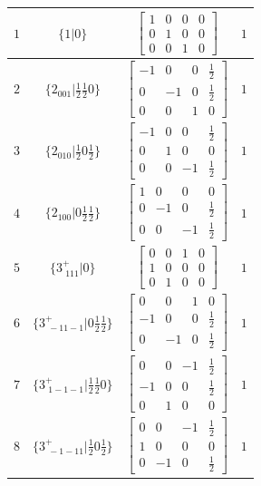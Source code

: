 \documentclass[fleqn,8pt]{jsarticle}
\begin{document}
\begin{longtable}{cccc}
$ 1 $ & $ \{1|0\} $ & $ \begin{bmatrix} 1 & 0 & 0 & 0 \\ 0 & 1 & 0 & 0 \\ 0 & 0 & 1 & 0 \end{bmatrix} $ & $ 1 $ \\ \hline
$ 2 $ & $ \{2{}_{001}|\frac{1}{2} \frac{1}{2} 0\} $ & $ \begin{bmatrix} -1 & 0 & 0 & \frac{1}{2} \\ 0 & -1 & 0 & \frac{1}{2} \\ 0 & 0 & 1 & 0 \end{bmatrix} $ & $ 1 $ \\ \hline
$ 3 $ & $ \{2{}_{010}|\frac{1}{2} 0 \frac{1}{2}\} $ & $ \begin{bmatrix} -1 & 0 & 0 & \frac{1}{2} \\ 0 & 1 & 0 & 0 \\ 0 & 0 & -1 & \frac{1}{2} \end{bmatrix} $ & $ 1 $ \\ \hline
$ 4 $ & $ \{2{}_{100}|0 \frac{1}{2} \frac{1}{2}\} $ & $ \begin{bmatrix} 1 & 0 & 0 & 0 \\ 0 & -1 & 0 & \frac{1}{2} \\ 0 & 0 & -1 & \frac{1}{2} \end{bmatrix} $ & $ 1 $ \\ \hline
$ 5 $ & $ \{3^{+}_{\,\,111}|0\} $ & $ \begin{bmatrix} 0 & 0 & 1 & 0 \\ 1 & 0 & 0 & 0 \\ 0 & 1 & 0 & 0 \end{bmatrix} $ & $ 1 $ \\ \hline
$ 6 $ & $ \{3^{+}_{\,\,-11-1}|0 \frac{1}{2} \frac{1}{2}\} $ & $ \begin{bmatrix} 0 & 0 & 1 & 0 \\ -1 & 0 & 0 & \frac{1}{2} \\ 0 & -1 & 0 & \frac{1}{2} \end{bmatrix} $ & $ 1 $ \\ \hline
$ 7 $ & $ \{3^{+}_{\,\,1-1-1}|\frac{1}{2} \frac{1}{2} 0\} $ & $ \begin{bmatrix} 0 & 0 & -1 & \frac{1}{2} \\ -1 & 0 & 0 & \frac{1}{2} \\ 0 & 1 & 0 & 0 \end{bmatrix} $ & $ 1 $ \\ \hline
$ 8 $ & $ \{3^{+}_{\,\,-1-11}|\frac{1}{2} 0 \frac{1}{2}\} $ & $ \begin{bmatrix} 0 & 0 & -1 & \frac{1}{2} \\ 1 & 0 & 0 & 0 \\ 0 & -1 & 0 & \frac{1}{2} \end{bmatrix} $ & $ 1 $ \\ \hline

\end{longtable}
\end{document}
